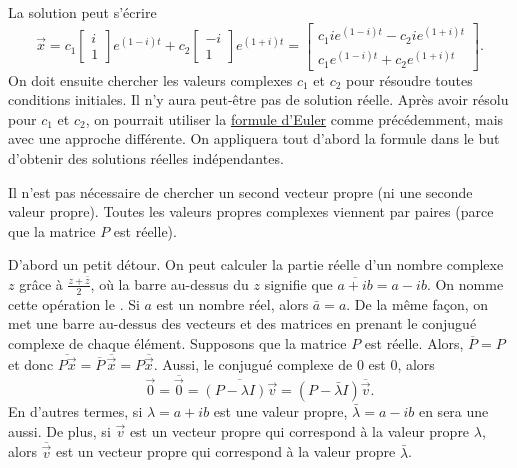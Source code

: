 La solution peut s’écrire
\begin{equation*}
\vec{x} =
c_1 \begin{bmatrix} i \\ 1 \end{bmatrix} e^{(1-i)t} +
c_2 \begin{bmatrix} -i \\ 1 \end{bmatrix} e^{(1+i)t}
=
\begin{bmatrix}
c_1 i e^{(1-i)t} - c_2 i e^{(1+i)t} \\
c_1 e^{(1-i)t} + c_2 e^{(1+i)t}
\end{bmatrix} .
\end{equation*}
On doit ensuite chercher les valeurs complexes $c_1$ et $c_2$ pour résoudre toutes conditions initiales. Il n’y aura peut-être pas de solution réelle. Après avoir résolu pour $c_1$ et $c_2$,
on pourrait utiliser la 
\hyperref[eulersformula]{formule d'Euler} comme précédemment, mais avec une approche différente. On appliquera tout d’abord la formule dans le but d’obtenir des solutions réelles indépendantes.

\medskip

Il n’est pas nécessaire de chercher un second vecteur propre (ni une seconde valeur propre). Toutes les valeurs propres complexes viennent par paires (parce que la matrice $P$ est réelle).

D’abord un petit détour. On peut calculer la partie réelle d’un nombre complexe $z$ grâce à $\frac{z + \bar{z}}{2}$, où la barre au-dessus du $z$ signifie que $\overline{a+ib} = a -ib$.  On nomme cette opération le \emph{}. Si
$a$ est un nombre réel, alors $\bar{a} = a$.
De la même façon, on met une barre au-dessus des vecteurs et des matrices en prenant le conjugué complexe de chaque élément. Supposons que la matrice $P$ est réelle. Alors, 
$\overline{P} = P$ et donc $\overline{P\vec{x}} = \overline{P} \,
\overline{\vec{x}} = P \overline{\vec{x}}$.
Aussi, le conjugué complexe de 0 est 0, alors
\begin{equation*}
\vec{0} = \overline{\vec{0}} = 
\overline{(P-\lambda I)\vec{v}}
=
(P-\bar{\lambda} I)\overline{\vec{v}} .
\end{equation*}
En d’autres termes, si $\lambda = a+ib$ est une valeur propre, $\bar{\lambda} = a-ib$ en sera une aussi. De plus, si
$\vec{v}$ est un vecteur propre qui correspond à la valeur propre
$\lambda$, alors $\overline{\vec{v}}$ est un vecteur propre qui correspond à la valeur propre $\bar{\lambda}$.  


